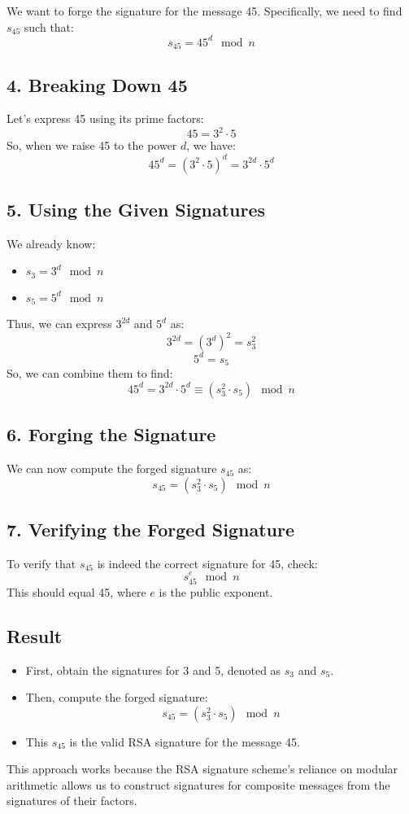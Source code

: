 \documentclass[12pt]{article}
\begin{document}
We want to forge the signature for the message 45. Specifically, we need to find \( s_{45} \) such that:
\[
s_{45} = 45^d \mod n
\]

\subsection*{4. Breaking Down 45}

Let's express 45 using its prime factors:
\[
45 = 3^2 \cdot 5
\]
So, when we raise 45 to the power \( d \), we have:
\[
45^d = (3^2 \cdot 5)^d = 3^{2d} \cdot 5^d
\]

\subsection*{5. Using the Given Signatures}

We already know:
\begin{itemize}
    \item \( s_3 = 3^d \mod n \)
    \item \( s_5 = 5^d \mod n \)
\end{itemize}
Thus, we can express \( 3^{2d} \) and \( 5^d \) as:
\[
3^{2d} = (3^d)^2 = s_3^2
\]
\[
5^d = s_5
\]
So, we can combine them to find:
\[
45^d = 3^{2d} \cdot 5^d \equiv (s_3^2 \cdot s_5) \mod n
\]

\subsection*{6. Forging the Signature}

We can now compute the forged signature \( s_{45} \) as:
\[
s_{45} = (s_3^2 \cdot s_5) \mod n
\]

\subsection*{7. Verifying the Forged Signature}

To verify that \( s_{45} \) is indeed the correct signature for 45, check:
\[
s_{45}^e \mod n
\]
This should equal 45, where \( e \) is the public exponent.

\subsection*{Result}

\begin{itemize}
    \item First, obtain the signatures for 3 and 5, denoted as \( s_3 \) and \( s_5 \).
    \item Then, compute the forged signature:
    \[
    s_{45} = (s_3^2 \cdot s_5) \mod n
    \]
    \item This \( s_{45} \) is the valid RSA signature for the message 45.
\end{itemize}

This approach works because the RSA signature scheme's reliance on modular arithmetic allows us to construct signatures for composite messages from the signatures of their factors.
\end{document}
